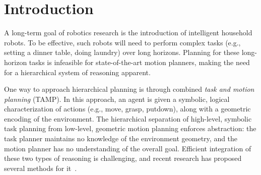 \section{Introduction}
A long-term goal of robotics research is the introduction of intelligent household robots.
To be effective, such robots will need to perform complex tasks (e.g., setting a dinner table, doing laundry)
over long horizons. Planning for these long-horizon tasks is infeasible
for state-of-the-art motion planners, making the need
for a hierarchical system of reasoning apparent.

One way to approach hierarchical planning is through combined \emph{task and motion planning} (TAMP). In this
approach, an agent is given a symbolic, logical characterization of actions (e.g., move, grasp,
putdown), along with a geometric encoding of the environment. The hierarchical separation of high-level, symbolic task planning
from low-level, geometric motion planning enforces abstraction:
the task planner maintains no knowledge of the environment geometry, and the
motion planner has no understanding of the overall goal.
Efficient integration of these two types of reasoning is challenging, and recent research has
proposed several methods for it~\cite{srivastava2014combined, kaelbling2011hierarchical,
lagriffoul2014orientation, GarrettWAFR14, dornhege2012semantic}.

